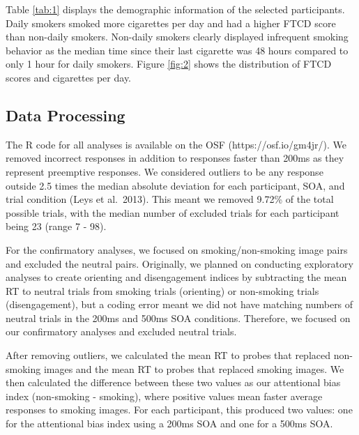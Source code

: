 \documentclass[empirical, authordate]{jote-new-article}
\begin{document}
Table \ref{tab:1} displays the demographic information of the selected participants. Daily smokers smoked more cigarettes per day and had a higher FTCD score than non-daily smokers. Non-daily smokers clearly displayed infrequent smoking behavior as the median time since their last cigarette was 48 hours compared to only 1 hour for daily smokers. Figure \ref{fig:2} shows the distribution of FTCD scores and cigarettes per day.


































\subsection{Data Processing}

The R code for all analyses is available on the OSF (https://osf.io/gm4jr/). We removed incorrect responses in addition to responses faster than 200ms as they represent preemptive responses. We considered outliers to be any response outside 2.5 times the median absolute deviation for each participant, SOA, and trial condition (Leys et al. 2013). This meant we removed 9.72\% of the total possible trials, with the median number of excluded trials for each participant being 23 (range 7 - 98).

For the confirmatory analyses, we focused on smoking/non-smoking image pairs and excluded the neutral pairs. Originally, we planned on conducting exploratory analyses to create orienting and disengagement indices \parencite{Salemink2007} by subtracting the mean RT to neutral trials from smoking trials (orienting) or non-smoking trials (disengagement), but a coding error meant we did not have matching numbers of neutral trials in the 200ms and 500ms SOA conditions. Therefore, we focused on our confirmatory analyses and excluded neutral trials.

After removing outliers, we calculated the mean RT to probes that replaced non-smoking images and the mean RT to probes that replaced smoking images. We then calculated the difference between these two values as our attentional bias index (non-smoking - smoking), where positive values mean faster average responses to smoking images. For each participant, this produced two values: one for the attentional bias index using a 200ms SOA and one for a 500ms SOA.
\end{document}
